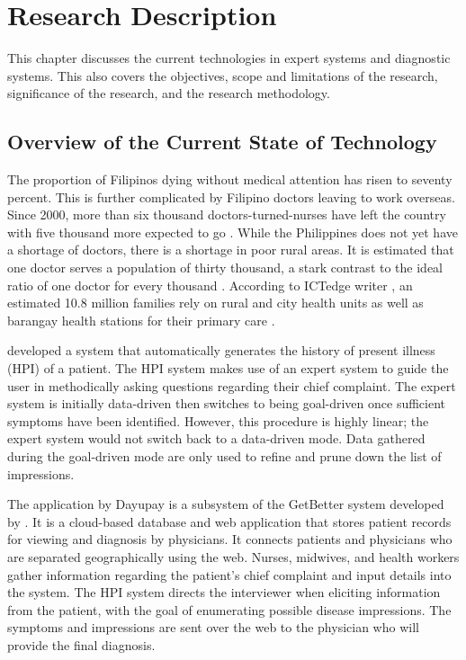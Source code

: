 %
%
%                 

\chapter{Research Description}
\label{sec:researchdesc}
This chapter discusses the current technologies in expert systems and diagnostic systems.
This also covers the objectives, scope and limitations of the research, significance of the research, and the research methodology.

\section{Overview of the Current State of Technology}
\label{sec:overview}
The proportion of Filipinos dying without medical attention has risen to seventy percent.
This is further complicated by Filipino doctors leaving to work overseas.
Since 2000, more than six thousand doctors-turned-nurses have left the country with five thousand more expected to go \cite{Harden:2008}.
While the Philippines does not yet have a shortage of doctors, there is a shortage in poor rural areas.
It is estimated that one doctor serves a population of thirty thousand, a stark contrast to the ideal ratio of one doctor for every thousand \cite{Manongdo:2014}.
According to ICTedge writer , an estimated 10.8 million families rely on rural and city health units as well as barangay health stations for their primary care . 

 developed a system that automatically generates the history of present illness (HPI) of a patient.
The HPI system makes use of an expert system to guide the user in methodically asking questions regarding their chief complaint. 
The expert system is initially data-driven then switches to being goal-driven once sufficient symptoms have been identified.
However, this procedure is highly linear; the expert system would not switch back to a data-driven mode.
Data gathered during the goal-driven mode are only used to refine and prune down the list of impressions.

The application by Dayupay is a subsystem of the GetBetter system developed by .
It is a cloud-based database and web application that stores patient records for viewing and diagnosis by physicians.
It connects patients and physicians who are separated geographically using the web.
Nurses, midwives, and health workers gather information regarding the patient's chief complaint and input details into the system.
The HPI system directs the interviewer when eliciting information from the patient, with the goal of enumerating possible disease impressions.
The symptoms and impressions are sent over the web to the physician who will provide the final diagnosis.    

